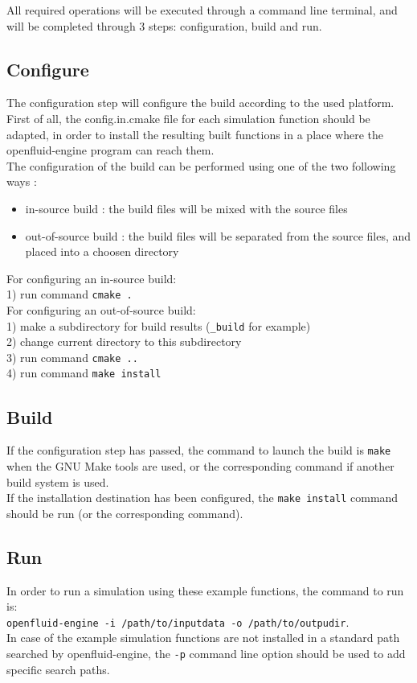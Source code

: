 \documentclass[a4paper,11pt]{article}
\begin{document}
\noindent All required operations will be executed through a command line terminal,
and will be completed through 3 steps: configuration, build and run.

\subsection{Configure}

The configuration step will configure the build according to the used platform. 
First of all, the config.in.cmake file for each simulation function should be 
adapted, in order to install the resulting built functions in a place where the 
openfluid-engine program can reach them.\\

\noindent The configuration of the build can be performed using one of the two
following ways :
\begin{itemize}
\item in-source build : the build files will be mixed with the source files 
\item out-of-source build : the build files will be separated from the source files,
and placed into a choosen directory
\end{itemize}
 

\noindent For configuring an in-source build:\\
1) run command \texttt{cmake .}\\

\noindent For configuring an out-of-source build:\\
1) make a subdirectory for build results (\texttt{\_build} for example)\\
2) change current directory to this subdirectory\\
3) run command \texttt{cmake ..}\\
4) run command \texttt{make install}\\

\subsection{Build}

If the configuration step has passed, the command to launch the build is
\texttt{make} when the GNU Make tools are used, or the corresponding command
if another build system is used.\\
If the installation destination has been configured, the \texttt{make install}
command should be run (or the corresponding command).   


\subsection{Run}

In order to run a simulation using these example functions, the command to run is:\\
\texttt{openfluid-engine -i /path/to/inputdata -o /path/to/outpudir}.\\

\noindent In case of the example simulation functions are not installed in a standard path 
searched by openfluid-engine, the \texttt{-p} command line option should be used 
to add specific search paths. 
\end{document}
